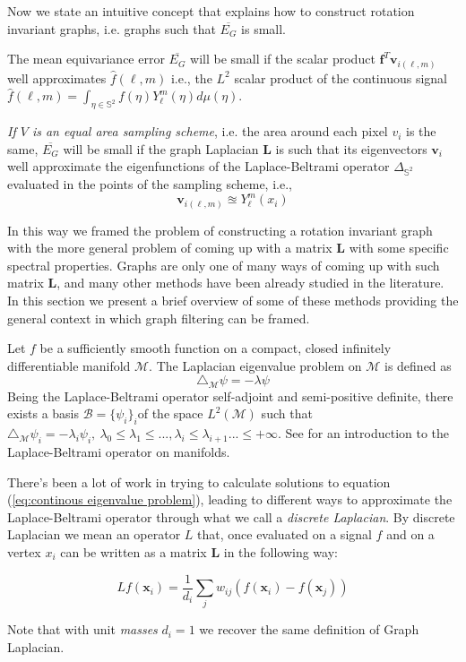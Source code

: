 Now we state an intuitive concept that explains how to construct rotation invariant graphs, i.e. graphs such that $\overline{E_G}$ is small.
\begin{snugshade*}
	The mean equivariance error $\overline{E_G}$ will be small if the scalar product $\mathbf f^T \mathbf v_{i(\ell, m)}$ well approximates $\hat {f}(\ell,m)$ i.e., the $L^2$ scalar product of the continuous signal \\
	$\hat {f}(\ell,m)= \int_{\eta \in \mathbb S^2}f(\eta)Y_\ell^m(\eta)d\mu(\eta)$.
	
	\textit{If $V$ is an equal area sampling scheme}, i.e. the area around each pixel $v_i$ is the same, $\overline{E_G}$ will be small if the graph Laplacian $\mathbf L$ is such that its eigenvectors $\mathbf v_i$ well approximate the eigenfunctions of the Laplace-Beltrami operator $\Delta_{\mathbb S^2}$ evaluated in the points of the sampling scheme, i.e., 
	$$
	\mathbf v_{i(\ell, m)} \approxeq Y_\ell^m(x_i)
	$$
\end{snugshade*}

In this way we framed the problem of constructing a rotation invariant graph with the more general problem of coming up with a matrix $\mathbf L$ with some specific spectral properties. Graphs are only one of many ways of coming up with such matrix $\mathbf L$, and many other methods have been already studied in the literature. In this section we present a brief overview of some of these methods providing the general context in which graph filtering can be framed.

Let $f$ be a sufficiently smooth function on a compact, closed infinitely differentiable manifold $\mathcal M$. The Laplacian eigenvalue problem on $\mathcal M$ is defined as 
\begin{equation}\label{eq:continous eigenvalue problem}
\triangle_{\mathcal M}\psi = -\lambda \psi
\end{equation}
Being the Laplace-Beltrami operator self-adjoint and semi-positive definite, there exists a basis $\mathcal B=\{\psi_i\}_i$of the space $L^2(\mathcal M)$ such that $\triangle_\mathcal M \psi_i = -\lambda_i\psi_i,\ \lambda_0\leq\lambda_1\leq...,\lambda_i\leq\lambda_{i+1}...\leq+\infty$. See \cite{rosenberg_1997} for an introduction to the Laplace-Beltrami operator on manifolds.

There's been a lot of work in trying to calculate solutions to equation (\ref{eq:continous eigenvalue problem}), leading to different ways to approximate the Laplace-Beltrami operator through what we call a \textit{discrete Laplacian}. By discrete Laplacian we mean an operator $L$ that, once evaluated on a signal $f$ and on a vertex $x_i$ can be written as a matrix $\mathbf L$ in the following way:

\begin{equation}\label{eq:discrete laplacian}
L f\left(\mathbf{x}_{i}\right)=\frac{1}{d_{i}} \sum_{j} w_{i j}\left(f\left(\mathbf{x}_{i}\right)-f\left(\mathbf{x}_{j}\right)\right)
\end{equation}

Note that with unit \textit{masses} $d_i=1$ we recover the same definition of Graph Laplacian.